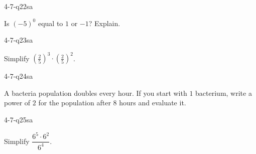 \begin{practiceQuestion}{4-7-q22}{sa}
\begin{questionText}
Is $(-5)^0$ equal to $1$ or $-1$? Explain.
\end{questionText}
\end{practiceQuestion}

\begin{practiceQuestion}{4-7-q23}{sa}
\begin{questionText}
Simplify $\left(\frac{2}{5}\right)^3 \cdot \left(\frac{2}{5}\right)^2$.
\end{questionText}
\end{practiceQuestion}

\begin{practiceQuestion}{4-7-q24}{sa}
\begin{questionText}
A bacteria population doubles every hour. If you start with $1$ bacterium, write a power of $2$ for the population after $8$ hours and evaluate it.
\end{questionText}
\end{practiceQuestion}

\begin{practiceQuestion}{4-7-q25}{sa}
\begin{questionText}
Simplify $\dfrac{6^5 \cdot 6^2}{6^4}$.
\end{questionText}
\end{practiceQuestion}


